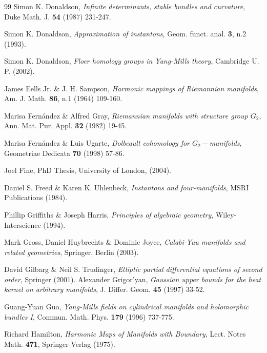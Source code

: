 \documentclass{article}
\begin{document}
\begin{thebibliography}{99}
 Simon K. Donaldson, \emph{%
Infinite determinants, stable bundles and curvature}, Duke Math. J. \textbf{%
54 }(1987) 231-247.

 Simon K. Donaldson, \emph{%
Approximation of instantons}, Geom. funct. anal. \textbf{3},
n.2 (1993).

 Simon K. Donaldson, \emph{Floer homology groups
in Yang-Mills theory}, Cambridge U. P. (2002).



 James Eells Jr. \& J. H. Sampson, \emph{%
Harmonic mappings of Riemannian manifolds}, Am. J. Math. 
\textbf{86}, n.1 (1964) 109-160.

 Marisa Fern\'andez \& Alfred Gray, \emph{Riemannian manifolds with structure group $G_2$}, Ann. Mat. Pur. Appl. \textbf{32} (1982) 19-45.

 Marisa  Fern\'andez \& Luis Ugarte, \emph{Dolbeault cohomology for $G_2-$manifolds}, Geometriae Dedicata \textbf{70} (1998) 57-86.

 Joel Fine, PhD Thesis, University of London, (2004).

 Daniel S. Freed \& Karen K. Uhlenbeck, \emph{%
Instantons and four-manifolds}, MSRI Publications (1984).

 Phillip Griffiths \& Joseph Harris, \emph{%
Principles of algebraic geometry}, Wiley-Interscience (1994).

 Mark Gross, Daniel Huybrechts \& Dominic Joyce, 
\emph{Calabi-Yau manifolds and related geometries}, Springer, Berlin (2003).

David Gilbarg \& Neil S. Trudinger, \emph{Elliptic partial differential equations of second order}, Springer (2001).
 Alexander Grigor'yan, \emph{Gaussian upper
bounds for the heat kernel on arbitrary manifolds}, J. Differ. Geom. 
\textbf{45 }(1997) 33-52.

 Guang-Yuan Guo, \emph{Yang-Mills fields on cylindrical
manifolds and holomorphic bundles I}, Commun. Math. Phys. \textbf{179 }%
(1996) 737-775.

 Richard Hamilton, \emph{Harmonic Maps of Manifolds
with Boundary}, Lect. Notes  Math. \textbf{471}, Springer-Verlag
(1975).


\end{thebibliography}
\end{document}
